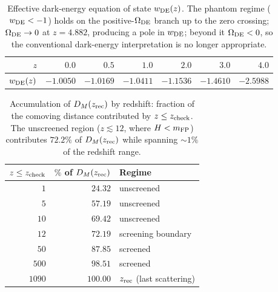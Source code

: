 \begin{table}[h]
\centering\small
\caption{Effective dark-energy equation of state $w_{\rm DE}(z)$. The phantom regime ($w_{\rm DE}<-1$) holds on the positive-$\Omega_{\mathrm{DE}}$ branch up to the zero crossing; $\Omega_{\mathrm{DE}}\to0$ at $z=4.882$, producing a pole in $w_{\rm DE}$; beyond it $\Omega_{\mathrm{DE}}<0$, so the conventional dark-energy interpretation is no longer appropriate.}\label{tab:A3}
\begin{tabular}{@{}rrrrrrr@{}}
\toprule
$z$ & $0.0$ & $0.5$ & $1.0$ & $2.0$ & $3.0$ & $4.0$\\
\midrule
$w_{\rm DE}(z)$ & $-1.0050$ & $-1.0169$ & $-1.0411$ & $-1.1536$ & $-1.4610$ & $-2.5988$\\
\bottomrule
\end{tabular}
\end{table}

\begin{table}[h]
\centering\small
\caption{Accumulation of $D_M(z_{\rm rec})$ by redshift: fraction of the comoving distance contributed by $z\le z_{\rm check}$. The unscreened region ($z\lesssim12$, where $H<m_{\mathrm{FP}}$) contributes $72.2\%$ of $D_M(z_{\rm rec})$ while spanning $\sim1\%$ of the redshift range.}\label{tab:A4}
\begin{tabular}{@{}rrl@{}}
\toprule
$z\le z_{\rm check}$ & $\%$ of $D_M(z_{\rm rec})$ & Regime\\
\midrule
$1$ & $24.32$ & unscreened\\
$5$ & $57.19$ & unscreened\\
$10$ & $69.42$ & unscreened\\
$12$ & $72.19$ & screening boundary\\
$50$ & $87.85$ & screened\\
$500$ & $98.51$ & screened\\
$1090$ & $100.00$ & $z_{\rm rec}$ (last scattering)\\
\bottomrule
\end{tabular}
\end{table}

